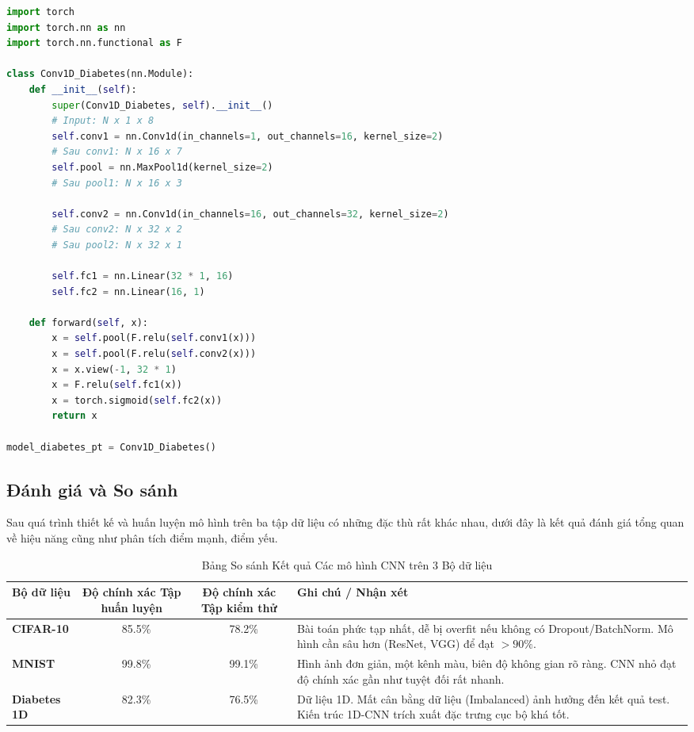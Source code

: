 \begin{lstlisting}[language=Python]
import torch
import torch.nn as nn
import torch.nn.functional as F

class Conv1D_Diabetes(nn.Module):
    def __init__(self):
        super(Conv1D_Diabetes, self).__init__()
        # Input: N x 1 x 8
        self.conv1 = nn.Conv1d(in_channels=1, out_channels=16, kernel_size=2)
        # Sau conv1: N x 16 x 7
        self.pool = nn.MaxPool1d(kernel_size=2)
        # Sau pool1: N x 16 x 3
        
        self.conv2 = nn.Conv1d(in_channels=16, out_channels=32, kernel_size=2)
        # Sau conv2: N x 32 x 2
        # Sau pool2: N x 32 x 1
        
        self.fc1 = nn.Linear(32 * 1, 16)
        self.fc2 = nn.Linear(16, 1)

    def forward(self, x):
        x = self.pool(F.relu(self.conv1(x)))
        x = self.pool(F.relu(self.conv2(x)))
        x = x.view(-1, 32 * 1)
        x = F.relu(self.fc1(x))
        x = torch.sigmoid(self.fc2(x))
        return x

model_diabetes_pt = Conv1D_Diabetes()
\end{lstlisting}

\newpage
\subsection{Đánh giá và So sánh}

Sau quá trình thiết kế và huấn luyện mô hình trên ba tập dữ liệu có những đặc thù rất khác nhau, dưới đây là kết quả đánh giá tổng quan về hiệu năng cũng như phân tích điểm mạnh, điểm yếu.

\begin{table}[h]
\centering
\caption{Bảng So sánh Kết quả Các mô hình CNN trên 3 Bộ dữ liệu}
\begin{tabular}{|l|c|c|p{5cm}|}
\hline
\textbf{Bộ dữ liệu} & \textbf{Độ chính xác Tập huấn luyện} & \textbf{Độ chính xác Tập kiểm thử} & \textbf{Ghi chú / Nhận xét} \\
\hline
\hline
\textbf{CIFAR-10} & ~ 85.5\% & ~ 78.2\% & Bài toán phức tạp nhất, dễ bị overfit nếu không có Dropout/BatchNorm. Mô hình cần sâu hơn (ResNet, VGG) để đạt $>90\%$. \\
\hline
\textbf{MNIST} & ~ 99.8\% & ~ 99.1\% & Hình ảnh đơn giản, một kênh màu, biên độ không gian rõ ràng. CNN nhỏ đạt độ chính xác gần như tuyệt đối rất nhanh. \\
\hline
\textbf{Diabetes 1D} & ~ 82.3\% & ~ 76.5\% & Dữ liệu 1D. Mất cân bằng dữ liệu (Imbalanced) ảnh hưởng đến kết quả test. Kiến trúc 1D-CNN trích xuất đặc trưng cục bộ khá tốt. \\
\hline
\end{tabular}
\end{table}

